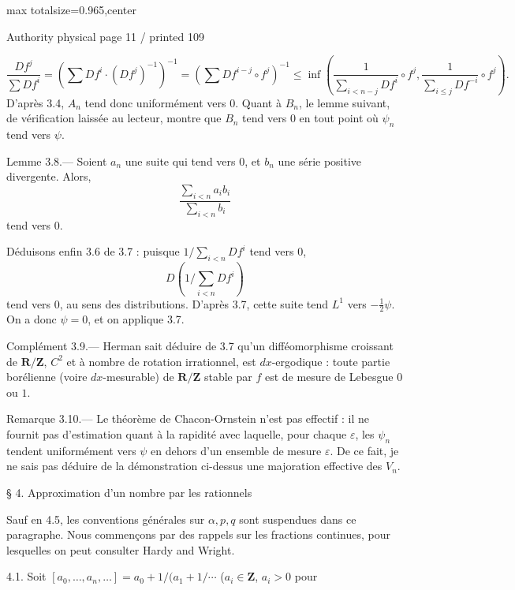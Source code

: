 \documentclass{article}
\begin{document}
\newpage
\noindent\begin{adjustbox}{max totalsize={\textwidth}{0.965\textheight},center}\begin{minipage}{\textwidth}
\noindent\hfill\scriptsize Authority physical page 11 / printed 109\par\normalsize
\[
\frac{Df^j}{\sum Df^i}
=\left(\sum Df^i\cdot(Df^j)^{-1}\right)^{-1}
=\left(\sum Df^{i-j}\circ f^j\right)^{-1}
\leq\inf\left(
\frac1{\sum_{i<n-j}Df^i}\circ f^j,
\frac1{\sum_{i\leq j}Df^{-i}}\circ f^j
\right).
\]
D’après 3.4, \(A_n\) tend donc uniformément vers \(0\). Quant à \(B_n\), le lemme suivant, de vérification laissée au lecteur, montre que \(B_n\) tend vers \(0\) en tout point où \(\psi_n\) tend vers \(\psi\).

Lemme 3.8.— Soient \(a_n\) une suite qui tend vers \(0\), et \(b_n\) une série positive divergente. Alors,
\[
\frac{\sum_{i<n}a_ib_i}{\sum_{i<n}b_i}
\]
tend vers \(0\).

Déduisons enfin 3.6 de 3.7 : puisque \(1/\sum_{i<n}Df^i\) tend vers \(0\),
\[
D\left(1/\sum_{i<n}Df^i\right)
\]
tend vers \(0\), au sens des distributions. D’après 3.7, cette suite tend \(L^1\) vers \(-\frac12\psi\). On a donc \(\psi=0\), et on applique 3.7.

Complément 3.9.— Herman sait déduire de 3.7 qu’un difféomorphisme croissant de \(\mathbf R/\mathbf Z\), \(C^2\) et à nombre de rotation irrationnel, est \(dx\)-ergodique : toute partie borélienne (voire \(dx\)-mesurable) de \(\mathbf R/\mathbf Z\) stable par \(f\) est de mesure de Lebesgue \(0\) ou \(1\).

Remarque 3.10.— Le théorème de Chacon-Ornstein n’est pas effectif : il ne fournit pas d’estimation quant à la rapidité avec laquelle, pour chaque \(\varepsilon\), les \(\psi_n\) tendent uniformément vers \(\psi\) en dehors d’un ensemble de mesure \(\varepsilon\). De ce fait, je ne sais pas déduire de la démonstration ci-dessus une majoration effective des \(V_n\).

§ 4. Approximation d’un nombre par les rationnels

Sauf en 4.5, les conventions générales sur \(\alpha,p,q\) sont suspendues dans ce paragraphe. Nous commençons par des rappels sur les fractions continues, pour lesquelles on peut consulter Hardy and Wright.

4.1. Soit \([a_0,\ldots,a_n,\ldots]=a_0+1/(a_1+1/\cdots\) (\(a_i\in\mathbf Z\), \(a_i>0\) pour
\end{minipage}\end{adjustbox}
\end{document}
